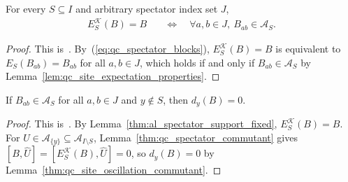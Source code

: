 \begin{lemma}
    \label{thm:al_spectator_support_fixed}
    \leanok
    For every $S\subseteq I$ and arbitrary spectator index set $J$,
    \begin{align}
        E_S^{\mathcal K}(B)=B
         & \quad\Longleftrightarrow\quad
        \forall a,b\in J,\ B_{ab}\in\mathcal A_S.
        \label{eq:al_propagation_support_fixed}
    \end{align}
\end{lemma}
\begin{proof}
    \leanok
    This is~\cite[``Physical support and spectator
        expectation'']{QICLean2026Blueprint}.
    By~(\ref{eq:qc_spectator_blocks}), $E_S^{\mathcal K}(B)=B$ is equivalent
    to $E_S(B_{ab})=B_{ab}$ for all $a,b\in J$, which holds if and only if
    $B_{ab}\in\mathcal A_S$ by Lemma~\ref{lem:qc_site_expectation_properties}.
\end{proof}

\begin{lemma}
    \label{thm:al_spectator_support_oscillation_zero}
    \leanok
    If $B_{ab}\in\mathcal A_S$ for all $a,b\in J$ and $y\notin S$, then
    $d_y(B)=0$.
\end{lemma}
\begin{proof}
    \leanok
    This is~\cite[``Vanishing oscillation outside the physical
        support'']{QICLean2026Blueprint}.
    By Lemma~\ref{thm:al_spectator_support_fixed}, $E_S^{\mathcal K}(B)=B$.
    For $U\in\mathcal A_{\{y\}}\subseteq\mathcal A_{I\setminus S}$,
    Lemma~\ref{thm:qc_spectator_commutant} gives
    $[B,\widehat U]=[E_S^{\mathcal K}(B),\widehat U]=0$, so $d_y(B)=0$ by
    Lemma~\ref{thm:qc_site_oscillation_commutant}.
\end{proof}

